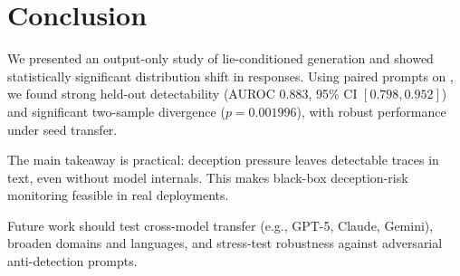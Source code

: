 \section{Conclusion}
\label{sec:conclusion}

We presented an output-only study of lie-conditioned generation and showed statistically significant distribution shift in \gptmodel responses. Using paired prompts on \truthfulqa, we found strong held-out detectability (AUROC 0.883, 95\% CI $[0.798, 0.952]$) and significant two-sample divergence (\mmd $p=0.001996$), with robust performance under seed transfer.

The main takeaway is practical: deception pressure leaves detectable traces in text, even without model internals. This makes black-box deception-risk monitoring feasible in real deployments.

Future work should test cross-model transfer (e.g., GPT-5, Claude, Gemini), broaden domains and languages, and stress-test robustness against adversarial anti-detection prompts.
